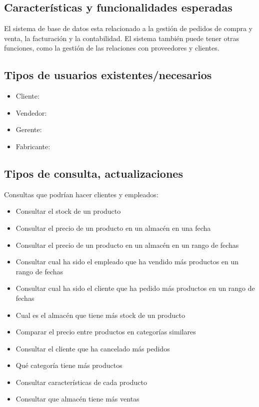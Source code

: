 \documentclass[10pt, a4paper,openany]{report}
\begin{document}
\subsection{Características y funcionalidades esperadas}
\label{subsec:Características y funcionalidades esperadas}

El sistema de base de datos esta relacionado a la gestión de pedidos de compra y venta, la facturación y la contabilidad. El sistema también puede tener otras funciones, como la gestión de las relaciones con proveedores y clientes.

\subsection{Tipos de usuarios existentes/necesarios}
\label{subsec:Tipos de usuarios existentes/necesarios}

\begin{itemize}
	\item Cliente:
	\item Vendedor:
	\item Gerente:
	\item Fabricante:
\end{itemize}

\subsection{Tipos de consulta, actualizaciones }
\label{subsec:Tipos de consulta-actualizaciones }

\noindent Consultas que podrían hacer clientes y empleados:
\begin{itemize}
	\item Consultar el stock de un producto
	\item Consultar el precio de un producto en un almacén en una fecha
	\item Consultar el precio de un producto en un almacén en un rango de fechas
	\item Consultar cual ha sido el empleado que ha vendido más productos en un rango de fechas
	\item Consultar cual ha sido el cliente que ha pedido más productos en un rango de fechas
	\item Cual es el almacén que tiene más stock de un producto
	\item Comparar el precio entre productos en categorías similares
	\item Consultar el cliente que ha cancelado más pedidos
	\item Qué categoría tiene más productos
	\item Consultar características de cada producto
	\item Consultar que almacén tiene más ventas

\end{itemize}
\end{document}
